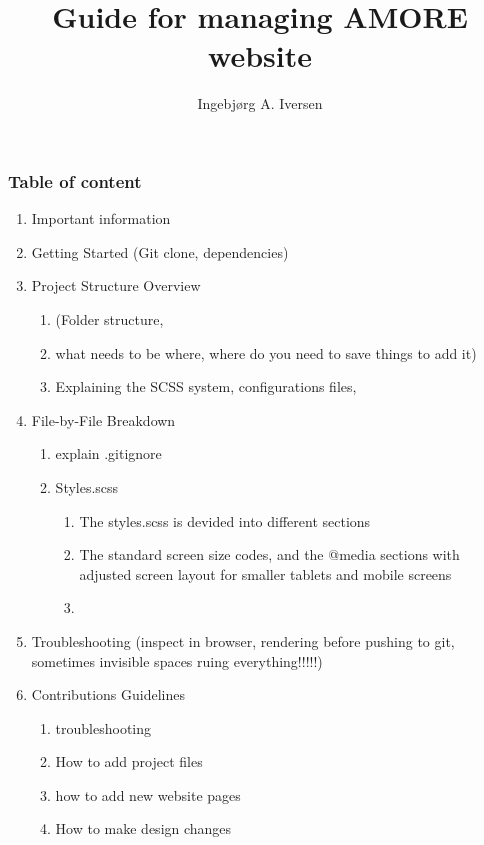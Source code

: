 \documentclass[
  letterpaper,
  DIV=11,
  numbers=noendperiod]{scrartcl}
\title{Guide for managing AMORE website}
\author{Ingebjørg A. Iversen}
\date{}
\providecommand{\tightlist}{%
  \setlength{\itemsep}{0pt}\setlength{\parskip}{0pt}}\usepackage{longtable,booktabs,array}
\begin{document}
\maketitle


\subsubsection{Table of content}\label{table-of-content}

\begin{enumerate}
\def\labelenumi{\arabic{enumi}.}
\tightlist
\item
  Important information
\item
  Getting Started (Git clone, dependencies)
\item
  Project Structure Overview

  \begin{enumerate}
  \def\labelenumii{\arabic{enumii}.}
  \item
    (Folder structure,
  \item
    what needs to be where, where do you need to save things to add it)
  \item
    Explaining the SCSS system, configurations files,
  \end{enumerate}
\item
  File-by-File Breakdown

  \begin{enumerate}
  \def\labelenumii{\arabic{enumii}.}
  \tightlist
  \item
    explain .gitignore
  \item
    Styles.scss

    \begin{enumerate}
    \def\labelenumiii{\arabic{enumiii}.}
    \tightlist
    \item
      The styles.scss is devided into different sections
    \item
      The standard screen size codes, and the @media sections with
      adjusted screen layout for smaller tablets and mobile screens
    \item
    \end{enumerate}
  \end{enumerate}
\item
  Troubleshooting (inspect in browser, rendering before pushing to git,
  sometimes invisible spaces ruing everything!!!!!)
\item
  Contributions Guidelines

  \begin{enumerate}
  \def\labelenumii{\arabic{enumii}.}
  \tightlist
  \item
    troubleshooting
  \item
    How to add project files
  \item
    how to add new website pages
  \item
    How to make design changes


\end{enumerate}
\end{enumerate}
\end{document}
